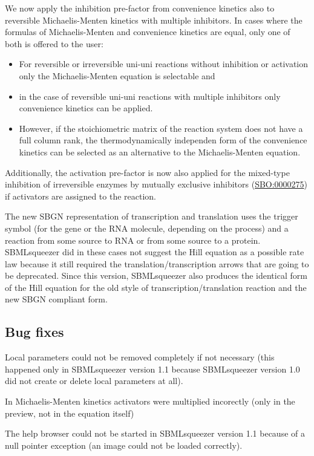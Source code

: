 We now apply the inhibition pre-factor from convenience kinetics also to
reversible Michaelis-Menten kinetics with multiple inhibitors. In cases where
the formulas of Michaelis-Menten and convenience kinetics are equal, only one of
both is offered to the user:
\begin{itemize}
\item For reversible or irreversible uni-uni reactions without inhibition or
      activation only the Michaelis-Menten equation is selectable and
\item in the case of reversible uni-uni reactions with multiple inhibitors only
      convenience kinetics can be applied.
\item However, if the stoichiometric matrix of the reaction system does not have
      a full column rank, the thermodynamically independen form of the
      convenience kinetics can be selected as an alternative to the
      Michaelis-Menten equation.
\end{itemize}
Additionally, the activation pre-factor is now also applied for the mixed-type
inhibition of irreversible enzymes by mutually exclusive inhibitors
(\href{identifiers.org/biomodels.sbo/SBO:0000275}{SBO:0000275}) if activators
are assigned to the reaction.

The new SBGN representation of transcription and translation uses the trigger
symbol (for the gene or the RNA molecule, depending on the process) and a
reaction from some source to RNA or from some source to a protein. SBMLsqueezer
did in these cases not suggest the Hill equation as a possible rate law because
it still required the translation/transcription arrows that are going to be
deprecated. Since this version, SBMLsqueezer also produces the identical form of
the Hill equation for the old style of transcription/translation reaction and
the new SBGN compliant form.

\subsection{Bug fixes}

Local parameters could not be removed completely if not necessary (this happened
only in SBMLsqueezer version 1.1 because SBMLsqueezer version 1.0 did not create
or delete local parameters at all).

In Michaelis-Menten kinetics activators were multiplied incorectly (only in the
preview, not in the equation itself)

The help browser could not be started in SBMLsqueezer version 1.1 because of a
null pointer exception (an image could not be loaded correctly).

